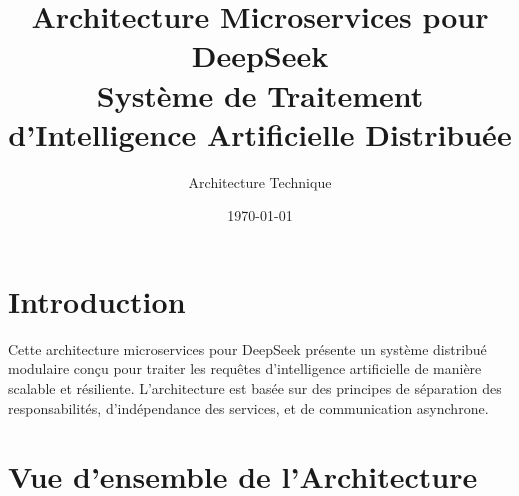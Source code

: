 \documentclass[12pt,a4paper]{article}
\title{\textbf{Architecture Microservices pour DeepSeek} \\ \large Système de Traitement d'Intelligence Artificielle Distribuée}
\author{Architecture Technique}
\date{\today}
\begin{document}
\maketitle

\tableofcontents
\newpage

\section{Introduction}

Cette architecture microservices pour DeepSeek présente un système distribué modulaire conçu pour traiter les requêtes d'intelligence artificielle de manière scalable et résiliente. L'architecture est basée sur des principes de séparation des responsabilités, d'indépendance des services, et de communication asynchrone.

\section{Vue d'ensemble de l'Architecture}
\end{document}
